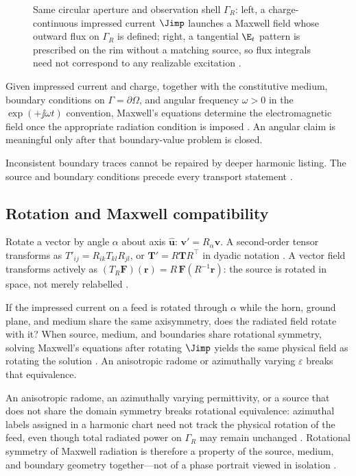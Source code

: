\begin{figure}[t]
\centering
\VolIPhysFig{\VolIPhysMatchedAperture}
\caption{Same circular aperture and observation shell $\Gamma_R$: left, a charge-continuous impressed current $\Jimp$ launches a Maxwell field whose outward flux on $\Gamma_R$ is defined; right, a tangential $\E_t$ pattern is prescribed on the rim without a matching source, so flux integrals need not correspond to any realizable excitation \cite{stratton1941,harrington2001}.}
\label{fig:ch1.wp-matched-aperture}
\end{figure}

Given impressed current and charge, together with the constitutive medium, boundary conditions on $\Gamma=\partial\Omega$, and angular frequency $\omega>0$ in the $\exp(+\jj\omega t)$ convention, Maxwell's equations determine the electromagnetic field once the appropriate radiation condition is imposed \cite{maxwell1873,stratton1941}. An angular claim is meaningful only after that boundary-value problem is closed.

Inconsistent boundary traces cannot be repaired by deeper harmonic listing. The source and boundary conditions precede every transport statement \cite{stratton1941}.
\subsection{Rotation and Maxwell compatibility}
\label{sec:ch01.0.2}

Rotate a vector by angle $\alpha$ about axis $\hat{\mathbf{u}}$:
$\mathbf{v}'=R_\alpha\mathbf{v}$. A second-order tensor transforms as
$T'_{ij}=R_{ik}T_{kl}R_{jl}$, or $\mathbf{T}'=R\mathbf{T}R^\top$ in dyadic notation
\cite{stratton1941}. A vector field transforms actively as
$(T_R\mathbf{F})(\mathbf{r})=R\,\mathbf{F}(R^{-1}\mathbf{r})$: the source is rotated in
space, not merely relabelled \cite{hansen1988}.

If the impressed current on a feed is rotated through $\alpha$ while the horn, ground
plane, and medium share the same axisymmetry, does the radiated field rotate with it?
When source, medium, and boundaries share rotational symmetry, solving Maxwell's
equations after rotating $\Jimp$ yields the same physical field as rotating the
solution \cite{stratton1941,hansen1988}. An anisotropic radome or azimuthally varying
$\varepsilon$ breaks that equivalence.

An anisotropic radome, an azimuthally varying permittivity, or a source that does not share the domain symmetry breaks rotational equivalence: azimuthal labels assigned in a harmonic chart need not track the physical rotation of the feed, even though total radiated power on $\Gamma_R$ may remain unchanged \cite{harrington2001}. Rotational symmetry of Maxwell radiation is therefore a property of the source, medium, and boundary geometry together---not of a phase portrait viewed in isolation \cite{stratton1941}.

